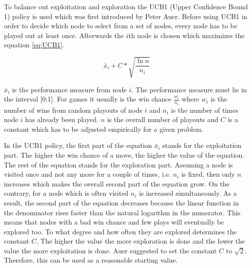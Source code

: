 \documentclass[english]{report} \usepackage[english]{babel}
\begin{document}
To balance out exploitation and exploration the UCB1 (Upper Confidence Bound 1)
policy is used which was first introduced by Peter Auer.\cite{paper:ucb1}
Before using UCB1 in order to decide which node to select from a set of nodes,
every node has to be played out at least once. Afterwards the \(i\)th node is
chosen which maximizes the equation \ref{eq:UCB1}.

\begin{equation}
\label{eq:UCB1}
\bar{x}_{i} + C * \sqrt{\frac{\ln n}{n_{i}}}
\end{equation}

\(\bar{x}_{i}\) is the performance measure from node \(i\). The performance measure
must lie in the interval [0;1]. For games it usually is the win chance
\(\frac{w_{i}}{n_{i}}\) where \(w_{i}\) is the number of wins from random
playouts of node \(i\) and \(n_{i}\) is the number of times node \(i\) has
already been played. \(n\) is the overall number of playouts and \(C\) is a
constant which has to be adjusted empirically for a given problem.\cite{thesis:uct}


In the UCB1 policy, the first part of the equation \(\bar{x}_{i}\) stands for the
exploitation part. The higher the win chance of a move, the higher the value of
the equation. The rest of the equation stands for the exploration part. Assuming
a node is visited once and not any more for a couple of times, i.e. \(n_{i}\) is
fixed, then only \(n\) increases which makes the overall second part of the
equation grow. On the contrary, for a node which is often visited \(n_{i}\) is
increased simultaneously. As a result, the second part of the equation decreases
because the linear function in the denominator rises faster than the natural
logarithm in the numerator. This means that nodes with a bad win chance and few
plays will eventually be explored too. To what degree and how often they are
explored determines the constant \(C\). The higher the value the more
exploration is done and the lower the value the more exploitation is done.
Auer suggested to set the constant \(C\) to
\(\sqrt{2}\).\cite{paper:ucb1} Therefore, this can be used as a
reasonable starting value.
\end{document}

